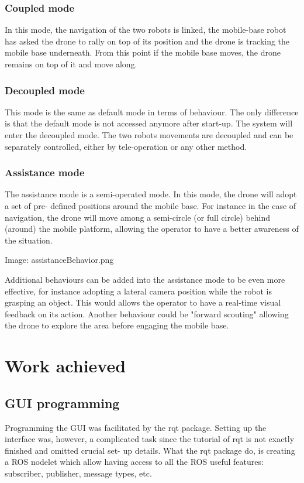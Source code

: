 \documentclass[11pt,a4paper]{article}
\newcommand{\centerImage}[1]{
\begin{center}
Image: #1
\end{center}
}
\begin{document}
\subsubsection{Coupled mode}
In this mode, the navigation of the two robots is linked, the mobile-base robot has asked the drone to 
rally on top of its position and the drone is tracking the mobile base underneath. From this point if the mobile base moves, the drone remains on top of it and move along.

\subsubsection{Decoupled mode}
This mode is the same as default mode in terms of behaviour. The only difference is that the default mode
is not accessed anymore after start-up. The system will enter the decoupled mode. The two robots movements
are decoupled and can be separately controlled, either by tele-operation or any other method.

\subsubsection{Assistance mode}
The assistance mode is a semi-operated mode. In this mode, the drone will adopt a set of pre-
defined
positions around the mobile base. For instance in the case of navigation, the drone will move 
among a semi-circle (or full circle) behind (around) the mobile platform, allowing the 
operator to have a better awareness of the situation.

\centerImage{assistanceBehavior.png}

Additional behaviours can be added into the assistance mode to be even more effective, for
 instance adopting a lateral camera position while the robot is grasping an object. This would
  allows the operator to have a real-time visual feedback on its action. Another behaviour
   could be "forward scouting" allowing the drone to explore the area before engaging the 
   mobile base.

\section{Work achieved}

\subsection{GUI programming}
Programming the GUI was facilitated by the rqt package. Setting up the interface was, however,
 a complicated task since the tutorial of rqt is not exactly finished and omitted crucial set-
 up details. What the rqt package do, is creating a ROS nodelet which allow having access to
all the ROS useful features: subscriber, publisher, message types, etc.
\end{document}
